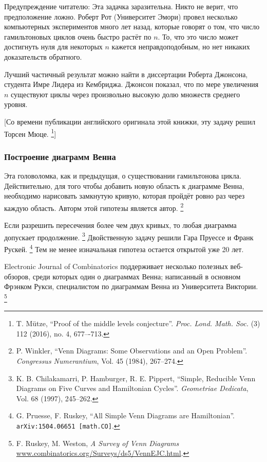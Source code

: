 Предупреждение читателю: Эта задачка заразительна. %
Никто не верит, что предположение ложно.
Роберт Рот (Университет Эмори) провел несколько компьютерных экспериментов много лет назад, которые говорят о том, что число гамильтоновых циклов очень быстро растёт по $n$.
То, что это число может достигнуть нуля для некоторых $n$ кажется неправдоподобным, но нет никаких доказательств обратного.

Лучший частичный результат можно найти в диссертации Роберта Джонсона, студента Имре Лидера из Кембриджа.
Джонсон показал, что по мере увеличения $n$ существуют циклы через произвольно высокую долю множеств среднего уровня.

[Со времени публикации английского оригинала этой книжки, эту задачу решил Торсен Мюце.
\footnote{T. Mütze, 
``Proof of the middle levels conjecture''.
\emph{Proc. Lond. Math. Soc.} (3) 112 (2016), no. 4, 677–-713.}]

\subsubsection*{Построение диаграмм Венна}

Эта головоломка, как и предыдущая, о существовании гамильтонова цикла. 
Действительно, для того чтобы добавить новую область к диаграмме Венна, необходимо нарисовать замкнутую кривую, которая пройдёт ровно раз через каждую область.
Авторм этой гипотезы является автор.%
\footnote{P. Winkler, ``Venn Diagrams: Some Observations and an Open Problem''. \emph{Congressus Numerantium}, Vol. 45 (1984), 267--274.}

Если разрешить пересечения более чем двух кривых, то любая диаграмма допускает продолжение.%
\footnote{K. B. Chilakamarri, P. Hamburger, R. E. Pippert,
``Simple, Reducible Venn Diagrams on Five Curves and Hamiltonian Cycles''. \emph{Geometriae Dedicata}, Vol. 68 (1997), 245--262.}
Двойственную задачу решили Гара Пруессе и Франк Рускей.%
\footnote{
G. Pruesse, F. Ruskey,
``All Simple Venn Diagrams are Hamiltonian''.
\texttt{arXiv:1504.06651 [math.CO]}.
}
Тем не менее изначальная гипотеза остается открытой уже 20 лет.

Electronic Journal of Combinatorics поддерживает несколько полезных веб-обзоров, среди которых один о диаграммах Венна; написанный в основном Фрэнком Рукси, специалистом по диаграммам Венна из Университета Виктории.%
\footnote{F. Ruskey, M. Weston, \emph{A Survey of Venn Diagrams} \href{http://www.combinatorics.org/Surveys/ds5/VennEJC.html}{\url{www.combinatorics.org/Surveys/ds5/VennEJC.html}}.}


